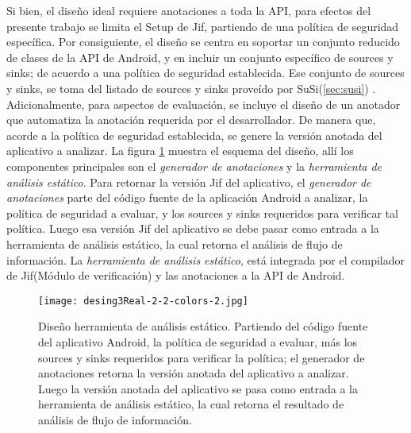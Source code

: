 Si bien, el diseño ideal requiere anotaciones a toda la API, para efectos del
presente trabajo se limita el Setup de Jif, partiendo de una política de
seguridad específica.
Por consiguiente, el diseño se centra en soportar un conjunto reducido de clases
de la API de Android, y en incluir un conjunto específico de sources y
sinks; de acuerdo a una política de seguridad establecida. Ese conjunto de
sources y sinks, se toma del listado de sources y sinks proveído por
SuSi(\ref{sec:susi}) .\newline
Adicionalmente, para aspectos de evaluación, se incluye el diseño de un anotador
que automatiza la anotación requerida por el desarrollador.
De manera que, acorde a la política de seguridad establecida, se genere la
versión anotada del aplicativo a analizar.\newline
La figura \ref{fig:desingReal} muestra el esquema del diseño, allí los componentes
principales son el \emph{generador de anotaciones} y la \emph{herramienta de
análisis estático}.\newline 
Para retornar la versión Jif del aplicativo, el \emph{generador de anotaciones}
parte del código fuente de la aplicación Android a analizar, la política de
seguridad a evaluar, y los sources y sinks requeridos para verificar tal
política.\newline 
Luego esa versión Jif del aplicativo se debe pasar como entrada a la herramienta
de análisis estático, la cual retorna el análisis de flujo de
información.\newline 
La \emph{herramienta de análisis estático}, está integrada
por el compilador de Jif(Módulo de verificación) y las anotaciones a la API de
Android.

\begin{figure}[t!]
	\begin{center} 
	\texttt{[image: desing3Real-2-2-colors-2.jpg]} 
	\end{center}
	\caption{Diseño herramienta de análisis estático.\newline
	Partiendo del código fuente del aplicativo Android, la política de seguridad a
	evaluar, más los sources y sinks requeridos para verificar la política; el
	generador de anotaciones retorna la versión anotada del aplicativo a analizar.
	Luego la versión anotada del aplicativo se pasa como entrada a la herramienta
	de análisis estático, la cual retorna el resultado de análisis de flujo de información.}
	\label{fig:desingReal}
\end{figure}


